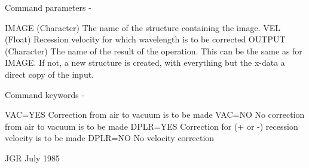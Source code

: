 \begin{description}
\begin{terminalv}
 Command parameters -

 IMAGE  (Character) The name of the structure containing the image.
 VEL    (Float) Recession velocity for which wavelength is to be
        corrected
 OUTPUT (Character) The name of the result of the operation.  This
        can be the same as for IMAGE.  If not, a new structure
        is created, with everything but the x-data a direct
        copy of the input.

 Command keywords -

 VAC=YES  Correction from air to vacuum is to be made
 VAC=NO   No correction from air to vacuum is to be made
 DPLR=YES Correction for (+ or -) recession velocity is to
          be made
 DPLR=NO  No velocity correction

                                  JGR  July 1985
\end{terminalv}
\end{description}
